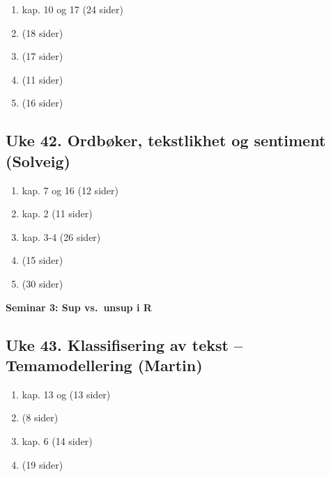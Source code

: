 \documentclass[
]{book}
\providecommand{\tightlist}{%
  \setlength{\itemsep}{0pt}\setlength{\parskip}{0pt}}
\begin{document}
\begin{enumerate}
\def\labelenumi{\arabic{enumi}.}
\tightlist
\item
  \citet{Grimmer2022} kap. 10 og 17 (24 sider)
\item
  \citet{dorazio_separating_2014} (18 sider)
\item
  \citet{feldman_sanger_20061} (17 sider)
\item
  \citet{feldman_sanger_20062} (11 sider)
\item
  \citet{muchlinski_siroky_he_kocher_2016} (16 sider)
\end{enumerate}

\hypertarget{uke-42.-ordbuxf8ker-tekstlikhet-og-sentiment-solveig}{%
\subsection{Uke 42. Ordbøker, tekstlikhet og sentiment (Solveig)}\label{uke-42.-ordbuxf8ker-tekstlikhet-og-sentiment-solveig}}

\begin{enumerate}
\def\labelenumi{\arabic{enumi}.}
\tightlist
\item
  \citet{Grimmer2022} kap. 7 og 16 (12 sider)
\item
  \citet{Silge2017} kap. 2 (11 sider)
\item
  \citet{Pang2008} kap. 3-4 (26 sider)
\item
  \citet{liu_introduction_2015} (15 sider)
\item
  \citet{liu_problem_2015} (30 sider)
\end{enumerate}

\textbf{Seminar 3: Sup vs.~unsup i R}

\hypertarget{uke-43.-klassifisering-av-tekst-temamodellering-martin}{%
\subsection{Uke 43. Klassifisering av tekst -- Temamodellering (Martin)}\label{uke-43.-klassifisering-av-tekst-temamodellering-martin}}

\begin{enumerate}
\def\labelenumi{\arabic{enumi}.}
\tightlist
\item
  \citet{Grimmer2022} kap. 13 og (13 sider)
\item
  \citet{Blei2012} (8 sider)
\item
  \citet{Silge2017} kap. 6 (14 sider)
\item
  \citet{Roberts2014} (19 sider)
\end{enumerate}
\end{document}
